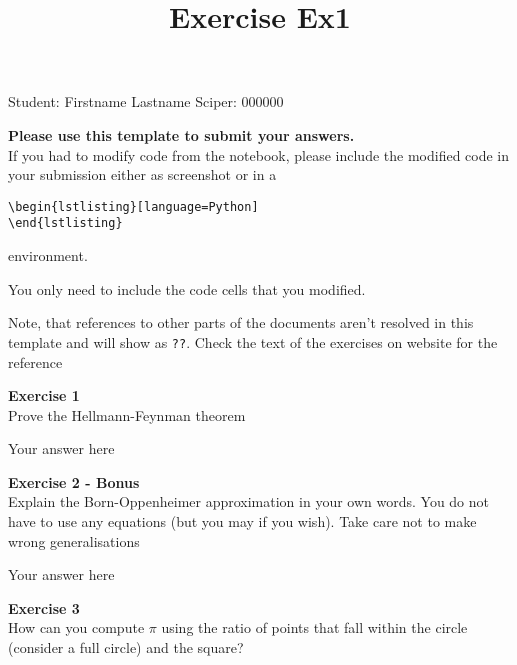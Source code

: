 \documentclass{article}
\title{Exercise Ex1}
\begin{document}
\maketitle\maketitle
\begin{center}\logo\end{center}


Student:  Firstname Lastname    Sciper: 000000

\begin{mdframed}
\textbf{Please use this template to submit your answers.}\\
If you had to modify code from the notebook, please include the modified code in your submission either as screenshot or in a

\begin{verbatim}
\begin{lstlisting}[language=Python]
\end{lstlisting}
\end{verbatim}

environment.

You only need to include the code cells that you modified.

Note, that references to other parts of the documents aren't resolved in this template and will show as \texttt{??}. Check the text of the exercises on website for the reference
\end{mdframed}

\begin{mdframed}
\textbf{Exercise 1}\\
Prove the Hellmann-Feynman theorem
\end{mdframed}

Your answer here

\begin{mdframed}
\textbf{Exercise 2 - Bonus}\\
Explain the Born-Oppenheimer approximation in your own words.  You do not have to use any equations (but you may if you wish). Take care not to make wrong generalisations
\end{mdframed}

Your answer here

\begin{mdframed}
\textbf{Exercise 3}\\
How can you compute $\pi$ using the ratio of points that fall within the circle (consider a full circle) and the square?
\end{mdframed}
\end{document}
